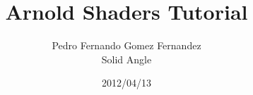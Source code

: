 \documentclass[12pt,a4paper,titlepage]{article}
\begin{document}
\renewcommand{\listingscaption}{Example}
\renewcommand{\theFancyVerbLine}{\sffamily\textcolor[rgb]{0.5,0.5,0.5}{\scriptsize\arabic{FancyVerbLine}}}

\title{\bfseries\huge Arnold Shaders Tutorial}
\author{Pedro Fernando Gomez Fernandez\\ Solid Angle}
\date{2012/04/13}
\maketitle

\tableofcontents
\newpage

\setcounter{page}{1}






\end{document}
